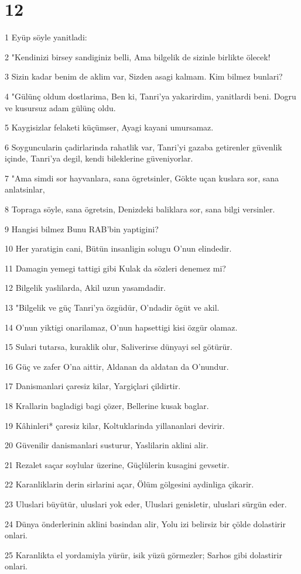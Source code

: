 \chapter{12}

\par 1 Eyüp söyle yanitladi:
\par 2 "Kendinizi birsey sandiginiz belli, Ama bilgelik de sizinle birlikte ölecek!
\par 3 Sizin kadar benim de aklim var, Sizden asagi kalmam. Kim bilmez bunlari?
\par 4 "Gülünç oldum dostlarima, Ben ki, Tanri'ya yakarirdim, yanitlardi beni. Dogru ve kusursuz adam gülünç oldu.
\par 5 Kaygisizlar felaketi küçümser, Ayagi kayani umursamaz.
\par 6 Soyguncularin çadirlarinda rahatlik var, Tanri'yi gazaba getirenler güvenlik içinde, Tanri'ya degil, kendi bileklerine güveniyorlar.
\par 7 "Ama simdi sor hayvanlara, sana ögretsinler, Gökte uçan kuslara sor, sana anlatsinlar,
\par 8 Topraga söyle, sana ögretsin, Denizdeki baliklara sor, sana bilgi versinler.
\par 9 Hangisi bilmez Bunu RAB'bin yaptigini?
\par 10 Her yaratigin cani, Bütün insanligin solugu O'nun elindedir.
\par 11 Damagin yemegi tattigi gibi Kulak da sözleri denemez mi?
\par 12 Bilgelik yaslilarda, Akil uzun yasamdadir.
\par 13 "Bilgelik ve güç Tanri'ya özgüdür, O'ndadir ögüt ve akil.
\par 14 O'nun yiktigi onarilamaz, O'nun hapsettigi kisi özgür olamaz.
\par 15 Sulari tutarsa, kuraklik olur, Saliverirse dünyayi sel götürür.
\par 16 Güç ve zafer O'na aittir, Aldanan da aldatan da O'nundur.
\par 17 Danismanlari çaresiz kilar, Yargiçlari çildirtir.
\par 18 Krallarin bagladigi bagi çözer, Bellerine kusak baglar.
\par 19 Kâhinleri* çaresiz kilar, Koltuklarinda yillananlari devirir.
\par 20 Güvenilir danismanlari susturur, Yaslilarin aklini alir.
\par 21 Rezalet saçar soylular üzerine, Güçlülerin kusagini gevsetir.
\par 22 Karanliklarin derin sirlarini açar, Ölüm gölgesini aydinliga çikarir.
\par 23 Uluslari büyütür, uluslari yok eder, Uluslari genisletir, uluslari sürgün eder.
\par 24 Dünya önderlerinin aklini basindan alir, Yolu izi belirsiz bir çölde dolastirir onlari.
\par 25 Karanlikta el yordamiyla yürür, isik yüzü görmezler; Sarhos gibi dolastirir onlari.

